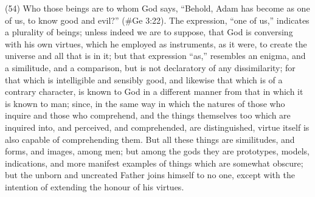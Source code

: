 (54) Who those beings are to whom God says, ``Behold, Adam has become as one of us, to know
good and evil?'' (\#Ge 3:22). The expression, ``one of us,'' indicates a plurality of beings; unless
indeed we are to suppose, that God is conversing with his own virtues, which he employed as
instruments, as it were, to create the universe and all that is in it; but that expression ``as,''
resembles an enigma, and a similitude, and a comparison, but is not declaratory of any
dissimilarity; for that which is intelligible and sensibly good, and likewise that which is of a contrary
character, is known to God in a different manner from that in which it is known to man; since, in the
same way in which the natures of those who inquire and those who comprehend, and the things
themselves too which are inquired into, and perceived, and comprehended, are distinguished,
virtue itself is also capable of comprehending them. But all these things are similitudes, and forms,
and images, among men; but among the gods they are prototypes, models, indications, and more
manifest examples of things which are somewhat obscure; but the unborn and uncreated Father
joins himself to no one, except with the intention of extending the honour of his virtues.

